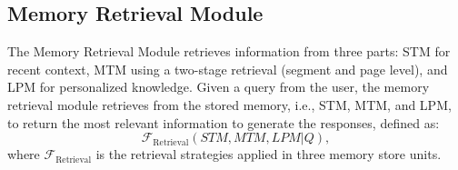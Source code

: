 \documentclass[11pt]{article}
\begin{document}

    
    
    






\subsection{Memory Retrieval Module}
The Memory Retrieval Module retrieves information from three parts: STM for recent context, MTM using a two-stage retrieval (segment and page level), and LPM for personalized knowledge.
Given a query from the user, the memory retrieval module retrieves from the stored
memory, i.e., STM, MTM, and LPM,  to return the most relevant information to generate the responses, defined as:
\begin{equation}
\mathcal{F}_\text{Retrieval}(STM, MTM, LPM | Q),
\end{equation}
where $\mathcal{F}_\text{Retrieval}$ is the retrieval strategies applied in three memory store units. 
\end{document}
